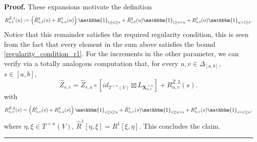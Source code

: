 \documentclass{article}%
\newenvironment{proof}[1][Proof]{\noindent\textbf{#1.} }{\ \rule{0.5em}{0.5em}}
\begin{document}
\begin{proof}
These expansions motivate the definition \[
R^{\hat{Z}, 1}_{s,t}(u) := \left(\hat{R}^2_{u,t}(u) +  R^{1}_{s,u}(u)\right) \mathbbm{1}_{t \geq u \geq s} + \hat{R}^2_{s,t}(u)\mathbbm{1}_{t \geq s >u} + R^1_{s,t}(u)  \mathbbm{1}_{u > t \geq s}.\]
Notice that this remainder satisfies the required regularity condition, this is seen from the fact that every element in the sum above satisfies the bound \eqref{regularity_condition_r1}.\newline
For the increments in the other parameter, we can verify via a totally analogous computation that, for every $u,v \in \Delta_{[a,b]}$, $s \in [a,b]$,
\[
\hat{Z}_{s,v} =\hat{Z}_{s,u} \circ  \left[ id_{T^{< \kappa}(V)} \boxtimes L_{\mathbf{X}^{< \kappa}_{u,v}} \right]
 + R^{\hat{Z}, 2}_{u,v}(s). \]
 with 
 \[
 R^{\hat{Z}, 2}_{u,v}(s) = \left(\hat{R}^1_{s,v}(s) +  R^{2}_{u,s}(s)\right) \mathbbm{1}_{v \geq s \geq u} + \hat{R}^1_{u,v}(s)\mathbbm{1}_{v \geq u >s} + R^2_{u,v}(s)  \mathbbm{1}_{s > v \geq u},
 \]
 where $\eta, \xi \in T^{< \kappa}(V)$, $\hat{R}^1[\eta, \xi] = R^1[ \xi, \eta]$.\newline
 This concludes the claim.
\end{proof}
\end{document}
